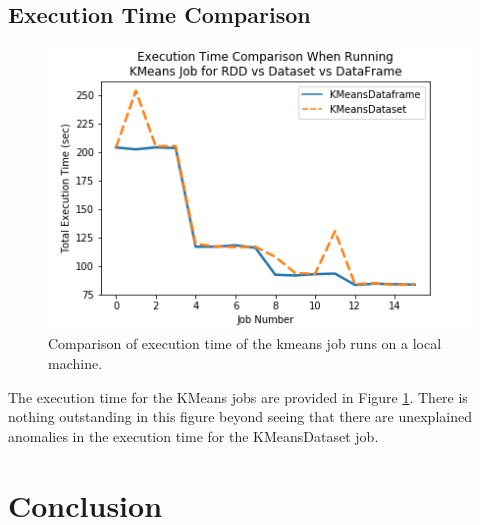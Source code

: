 \documentclass[conference]{IEEEtran}
\begin{document}
\subsection{Execution Time Comparison}
\begin{figure}
    \includegraphics[width=\linewidth]{../python_scripts/images/kmeansJobAllExecutionTime.png}
    \caption{Comparison of execution time of the kmeans job runs on a local machine.}
    \label{fig:kmeansJobAllExecutionTime}
\end{figure}

The execution time for the KMeans jobs are provided in Figure \ref{fig:kmeansJobAllExecutionTime}.
There is nothing outstanding in this figure beyond seeing that there are unexplained anomalies in the execution time for the KMeansDataset job.

\section{Conclusion}
\end{document}
